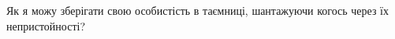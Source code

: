 \documentclass[border=0pt,varwidth=15.4cm]{standalone}
\begin{document}
\fontsize{10}{13}\selectfont
\raggedright Як я можу зберігати свою особистість в таємниці, шантажуючи когось через їх непристойності?
\end{document}
